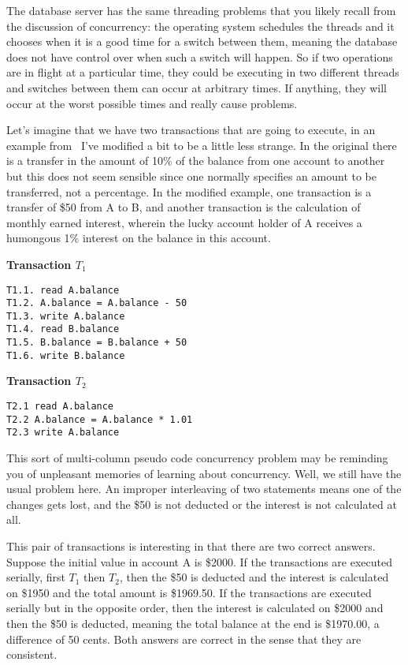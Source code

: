 \documentclass[a4paper]{report}
\begin{document}
The database server has the same threading problems that you likely recall from the discussion of concurrency: the operating system schedules the threads and it chooses when it is a good time for a switch between them, meaning the database does not have control over when such a switch will happen. So if two operations are in flight at a particular time, they could be executing in two different threads and switches between them can occur at arbitrary times. If anything, they will occur at the worst possible times and really cause problems.

Let's imagine that we have two transactions that are going to execute, in an example from~\cite{dsc} I've modified a bit to be a little less strange. In the original there is a transfer in the amount of 10\% of the balance from one account to another but this does not seem sensible since one normally specifies an amount to be transferred, not a percentage. In the modified example, one transaction is a transfer of \$50 from A to B, and another transaction is the calculation of monthly earned interest, wherein the lucky account holder of A receives a humongous 1\% interest on the balance in this account.

\begin{multicols}{2}
\textbf{Transaction $T_{1}$}
\begin{verbatim}
T1.1. read A.balance
T1.2. A.balance = A.balance - 50
T1.3. write A.balance
T1.4. read B.balance
T1.5. B.balance = B.balance + 50
T1.6. write B.balance
\end{verbatim}
\columnbreak
\textbf{Transaction $T_{2}$}

\begin{verbatim}
T2.1 read A.balance
T2.2 A.balance = A.balance * 1.01
T2.3 write A.balance
\end{verbatim}

\end{multicols}

This sort of multi-column pseudo code concurrency problem may be reminding you of unpleasant memories of learning about concurrency. Well, we still have the usual problem here. An improper interleaving of two statements means one of the changes gets lost, and the \$50 is not deducted or the interest is not calculated at all. 

This pair of transactions is interesting in that there are two correct answers. Suppose the initial value in account A is \$2000. If the transactions are executed serially, first $T_{1}$ then $T_{2}$, then the \$50 is deducted and the interest is calculated on \$1950  and the total amount is \$1969.50. If the transactions are executed serially but in the opposite order, then the interest is calculated on \$2000 and then the \$50 is deducted, meaning the total balance at the end is \$1970.00, a difference of 50 cents. Both answers are correct in the sense that they are consistent.
\end{document}
